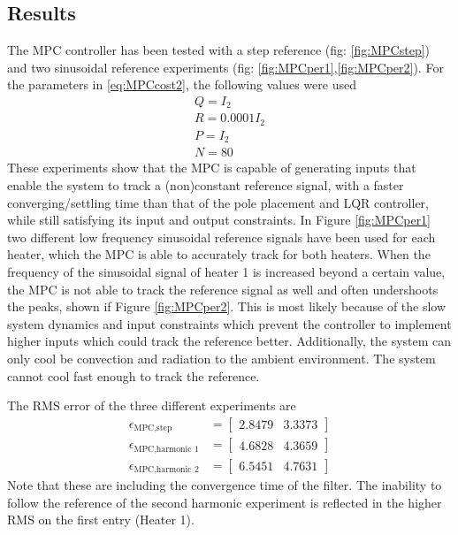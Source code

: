 \subsection{Results}\label{sec:MPC_Results}
The MPC controller has been tested with a step reference (fig: \ref{fig:MPCstep}) and two sinusoidal reference experiments (fig: \ref{fig:MPCper1},\ref{fig:MPCper2}). For the parameters in \ref{eq:MPCcost2}, the following values were used
\begin{align*}
    Q = I_2\\
    R = 0.0001I_2\\
    P = I_2\\
    N = 80
\end{align*}
These experiments show that the MPC is capable of generating inputs that enable the system to track a (non)constant reference signal, with a faster converging/settling time than that of the pole placement and LQR controller, while still satisfying its input and output constraints. In Figure \ref{fig:MPCper1} two different low frequency sinusoidal reference signals have been used for each heater, which the MPC is able to accurately track for both heaters. When the frequency of the sinusoidal signal of heater 1 is increased beyond a certain value, the MPC is not able to track the reference signal as well and often undershoots the peaks, shown if Figure \ref{fig:MPCper2}. This is most likely because of the slow system dynamics and input constraints which prevent the controller to implement higher inputs which could track the reference better. Additionally, the system can only cool be convection and radiation to the ambient environment. The system cannot cool fast enough to track the reference.

The RMS error of the three different experiments are
\begin{align*}
    \epsilon_{\text{MPC,step}} &= \begin{bmatrix} 2.8479 & 3.3373\end{bmatrix}\\
    \epsilon_{\text{MPC,harmonic 1}} &= \begin{bmatrix} 4.6828 & 4.3659 \end{bmatrix}\\
    \epsilon_{\text{MPC,harmonic 2}} &= \begin{bmatrix} 6.5451 & 4.7631\end{bmatrix}
\end{align*}
Note that these are including the convergence time of the filter. The inability to follow the reference of the second harmonic experiment is reflected in the higher RMS on the first entry (Heater 1).


